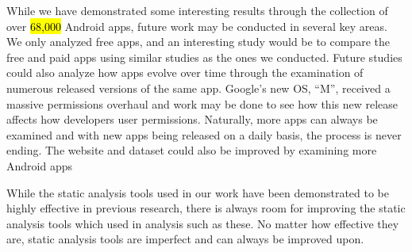 
While we have demonstrated some interesting results through the collection of over \hl{68,000} Android apps, future work may be conducted in several key areas. We only analyzed free apps, and an interesting study would be to compare the free and paid apps using similar studies as the ones we conducted. Future studies could also analyze how apps evolve over time through the examination of numerous released versions of the same app. Google's new OS, ``M'', received a massive permissions overhaul and work may be done to see how this new release affects how developers user permissions. Naturally, more apps can always be examined and with new apps being released on a daily basis, the process is never ending.
The website and dataset could also be improved by examining more Android apps

While the static analysis tools used in our work have been demonstrated to be highly effective in previous research, there is always room for improving the static analysis tools which used in analysis such as these. No matter how effective they are, static analysis tools are imperfect and can always be improved upon.





